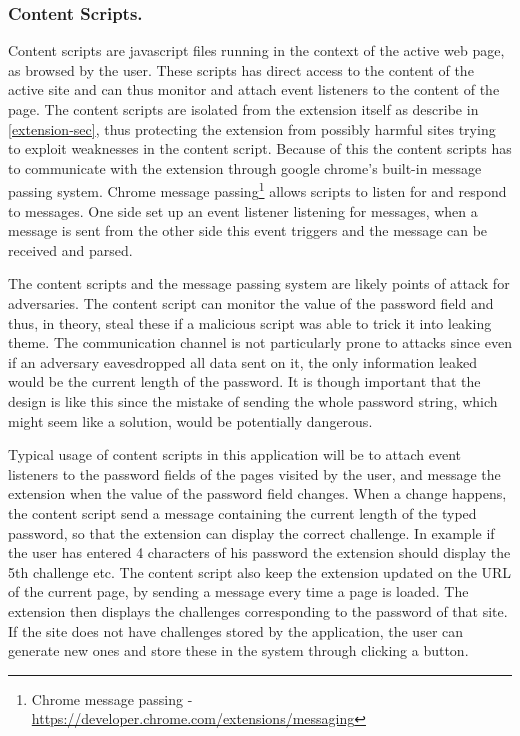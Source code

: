 \subsubsection{Content Scripts.}\label{cs}
Content scripts are javascript files running in the context of the active web page, as browsed by the user. These scripts has direct access to the content of the active site and can thus monitor and attach event listeners to the content of the page. The content scripts are isolated from the extension itself as describe in \autoref{extension-sec}, thus protecting the extension from possibly harmful sites trying to exploit weaknesses in the content script. Because of this the content scripts has to communicate with the extension through google chrome's built-in message passing system. Chrome message passing\footnote{Chrome message passing - \url{https://developer.chrome.com/extensions/messaging}} allows scripts to listen for and respond to messages. One side set up an event listener listening for messages, when a message is sent from the other side this event triggers and the message can be received and parsed. 
\par The content scripts and the message passing system are likely points of attack for adversaries. The content script can monitor the value of the password field and thus, in theory, steal these if a malicious script was able to trick it into leaking theme. The communication channel is not particularly prone to attacks since even if an adversary eavesdropped all data sent on it, the only information leaked would be the current length of the password. It is though important that the design is like this since the mistake of sending the whole password string, which might seem like a solution, would be potentially dangerous. 
\par Typical usage of content scripts in this application will be to attach event listeners to the password fields of the pages visited by the user, and message the extension when the value of the password field changes. When a change happens, the content script send a message containing the current length of the typed password, so that the extension can display the correct challenge. In example if the user has entered 4 characters of his password the extension should display the 5th challenge etc. The content script also keep the extension updated on the URL of the current page, by sending a message every time a page is loaded. The extension then displays the challenges corresponding to the password of that site. If the site does not have challenges stored by the application, the user can generate new ones and store these in the system through clicking a button.  

